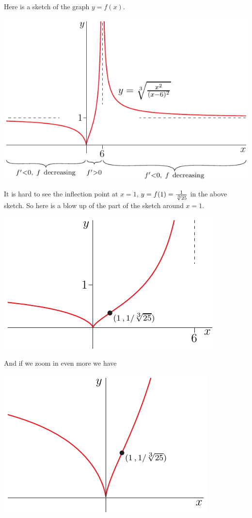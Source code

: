\begin{eg}[$f(x)=\root{3}\of{\frac{x^2}{(x-6)^2}}\ $]
Here is a sketch of the graph $y=f(x)$.
\begin{efig}
\begin{center}
   \includegraphics{sketch3}
\end{center}
\end{efig}
It is hard to see the inflection point at $x=1$,
$y=f(1)=\frac{1}{ \root{3}\of{25} }$
in the above sketch. So here is a blow up of the part of the sketch
around $x=1$.

\begin{efig}
\begin{center}
   \includegraphics{sketch3b}
\end{center}
\end{efig}
And if we zoom in even more we have
\begin{efig}
\begin{center}
   \includegraphics{sketch3c}
\end{center}
\end{efig}



\end{eg}

